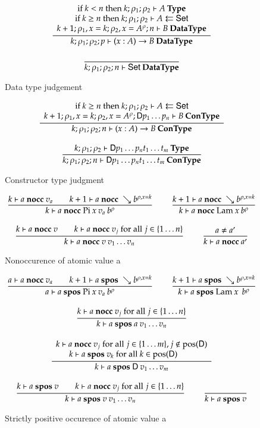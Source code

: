 \newcommand{\nocc}[3]{#1\vdash#2\mbox{ \textbf{nocc} }#3}

\begin{figure}[p]
\begin{gather*}
\ \dfrac{\begin{array}[b]{c}\mbox {if } k < n \mbox{ then } k;\rho_1;\rho_2\vdash A\:\mathbf{Type}\\\mbox {if } k \geq n \mbox { then } k;\rho_1;\rho_2\vdash A\leftleftarrows\mathsf{Set}\\k+1;\rho_1,x=k;\rho_2,x=A^{\rho};n\vdash B\:\mathbf{DataType}\end{array}}{k;\rho_1;\rho_2;p\vdash( x : A ) \rightarrow{B}\:\mathbf{DataType}}
\\[2ex]
\ \dfrac{}{k;\rho_1;\rho_2;n\vdash\mathsf{Set}\:\mathbf{DataType}}
\end{gather*}
\caption{Data type judgement}
\end{figure}

\begin{figure}[p]
\begin{gather*}
\ \dfrac{\begin{array}[b]{c}\mbox {if } k \geq n \mbox { then } k;\rho_1;\rho_2\vdash A\leftleftarrows\mathsf{Set}\\k+1;\rho_1,x=k;\rho_2,x=A^{\rho};\mathsf{D} p_1 \ldots p_n\vdash B\:\mathbf{ConType}\end{array}}{k;\rho_1;\rho_2;n\vdash( x : A ) \rightarrow{B}\:\mathbf{ConType}}
\\[2ex]
\ \dfrac{k;\rho_1;\rho_2\vdash\mathsf{D} p_1 \ldots p_n t_1 \ldots t_m\:\mathbf{Type}}{k;\rho_1;\rho_2;n\vdash\mathsf{D} p_1 \ldots p_n t_1 \ldots t_m\:\mathbf{ConType}}
\end{gather*}
\caption{Constructor type judgment}
\end{figure}


\begin{figure}[p]
\begin{gather*}
\nru{}
{\nocc{k}{a}{v_a} \qquad \nocc{k+1}{a}{\wh \cl{b}{\ins{\rho}{x}{k}}}}
{\nocc{k}{a}{\vpi \: x \: v_a \: \cl{b}{\rho}}  }
\qquad
\nru{}
{\nocc{k+1}{a}{\wh \cl{b}{\ins{\rho}{x}{k}}}}
{\nocc{k}{a}{\vlam \: x \: \cl{b}{\rho}}  }
\\[2ex]
\nru{}
{\nocc{k}{a}{v} \qquad \nocc{k}{a}{v_j} \mbox{ for all } j \in \{1 \ldots n \}}
{\nocc{k}{a}{v \: v_1 \ldots v_n}}
\qquad
\nru{}
{a \neq a'}
{\nocc{k}{a}{a'}}
\end{gather*}
\caption{Nonoccurence of atomic value a}
\end{figure}

\begin{figure}[p]
\begin{gather*}
\nru{}
{ \nocc{a}{a}{v_a} \qquad \spos{k+1}{a}{\wh \cl{b}{\ins{\rho}{x}{k}}}}
{\spos{a}{a}{\vpi \: x \: v_a \: \cl{b}{\rho}}  }
\qquad
\nru{}
{\spos{k+1}{a}{\wh \cl{b}{\ins{\rho}{x}{k}}}}
{\spos{k}{a}{\vlam \: x \: \: \cl{b}{\rho}}  }
\\[2ex]
\nru{}
{\nocc{k}{a}{v_j} \mbox{ for all } j \in \{1 \ldots n \}} 
{\spos{k}{a}{a \: v_1 \ldots v_n}}
\\[2ex]
\ndru{}
{\nocc{k}{a}{v_j} \mbox{ for all } j \in \{ 1 \ldots m\} , j \notin \pos(\DD)}
{\spos{k}{a}{v_k} \mbox{ for all } k \in \pos(\DD) \qquad}
{\spos{k}{a}{\DD \: v_1 \ldots v_m}}
\\[2ex]
\nru{}
{\spos{k}{a}{v} \qquad \nocc{k}{a}{v_j} \mbox{ for all } j \in \{1 \ldots n \}}
{\spos{k}{a}{v \: v_1 \ldots v_n}}
\qquad
\nru{}
{}
{\spos{k}{a}{v}}
\end{gather*}
\caption{Strictly positive occurence of atomic value a}
\end{figure}



